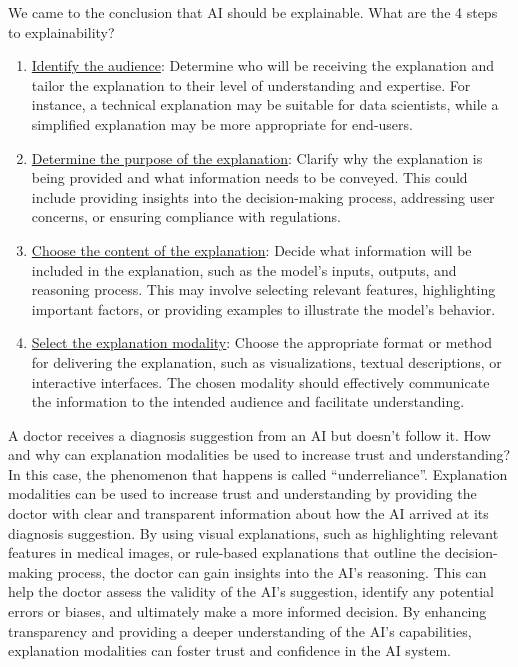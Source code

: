 \begin{ejercicio}
    We came to the conclusion that AI should be explainable. What are the 4 steps to explainability?
    \begin{enumerate}
        \item \ul{Identify the audience}: Determine who will be receiving the explanation and tailor the explanation to their level of understanding and expertise. For instance, a technical explanation may be suitable for data scientists, while a simplified explanation may be more appropriate for end-users.
        \item \ul{Determine the purpose of the explanation}: Clarify why the explanation is being provided and what information needs to be conveyed. This could include providing insights into the decision-making process, addressing user concerns, or ensuring compliance with regulations.
        \item \ul{Choose the content of the explanation}: Decide what information will be included in the explanation, such as the model's inputs, outputs, and reasoning process. This may involve selecting relevant features, highlighting important factors, or providing examples to illustrate the model's behavior.
        \item \ul{Select the explanation modality}: Choose the appropriate format or method for delivering the explanation, such as visualizations, textual descriptions, or interactive interfaces. The chosen modality should effectively communicate the information to the intended audience and facilitate understanding.
    \end{enumerate}
\end{ejercicio}

\begin{ejercicio}
    A doctor receives a diagnosis suggestion from an AI but doesn't follow it. How and why can explanation modalities be used to increase trust and understanding?\\

    In this case, the phenomenon that happens is called ``underreliance''. Explanation modalities can be used to increase trust and understanding by providing the doctor with clear and transparent information about how the AI arrived at its diagnosis suggestion. By using visual explanations, such as highlighting relevant features in medical images, or rule-based explanations that outline the decision-making process, the doctor can gain insights into the AI's reasoning. This can help the doctor assess the validity of the AI's suggestion, identify any potential errors or biases, and ultimately make a more informed decision. By enhancing transparency and providing a deeper understanding of the AI's capabilities, explanation modalities can foster trust and confidence in the AI system.
\end{ejercicio}

